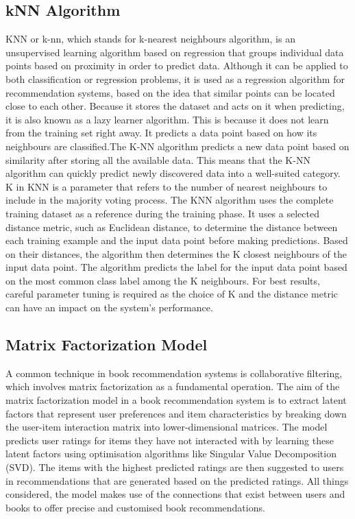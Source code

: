 \subsection{kNN Algorithm}
 KNN or k-nn, which stands for k-nearest neighbours algorithm, is an unsupervised learning algorithm based on regression that groups individual data points based on proximity in order to predict data. Although it can be applied to both classification or regression problems, it is used as a regression algorithm for recommendation systems, based on the idea that similar points can be located close to each other. Because it stores the dataset and acts on it when predicting, it is also known as a lazy learner algorithm. This is because it does not learn from the training set right away. It predicts a data point based on how its neighbours are classified.The K-NN algorithm predicts a new data point based on similarity after storing all the available data. This means that the K-NN algorithm can quickly predict newly discovered data into a well-suited category. K in KNN is a parameter that refers to the number of nearest neighbours to include in the majority voting process. The KNN algorithm uses the complete training dataset as a reference during the training phase. It uses a selected distance metric, such as Euclidean distance, to determine the distance between each training example and the input data point before making predictions. Based on their distances, the algorithm then determines the K closest neighbours of the input data point. The algorithm predicts the label for the input data point based on the most common class label among the K neighbours. For best results, careful parameter tuning is required as the choice of K and the distance metric can have an impact on the system's performance.

\subsection{Matrix Factorization Model}
A common technique in book recommendation systems is collaborative filtering, which involves matrix factorization as a fundamental operation. The aim of the matrix factorization model in a book recommendation system is to extract latent factors that represent user preferences and item characteristics by breaking down the user-item interaction matrix into lower-dimensional matrices. The model predicts user ratings for items they have not interacted with by learning these latent factors using optimisation algorithms like Singular Value Decomposition (SVD). The items with the highest predicted ratings are then suggested to users in recommendations that are generated based on the predicted ratings. All things considered, the model makes use of the connections that exist between users and books to offer precise and customised book recommendations.\\

